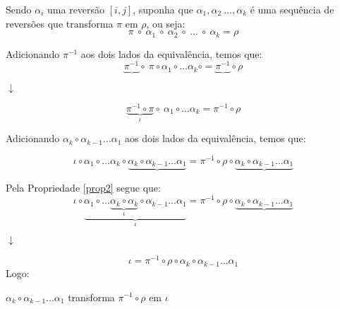 \begin{prova}
Sendo $\alpha_i$ uma reversão $[i, j]$, suponha que $\alpha_1, \alpha_2 \ \ldots,\alpha_k$ é uma sequência de reversões que transforma $\pi$ em $\rho$, ou seja:
\[ \pi \ \circ \ \alpha_1 \ \circ \ \alpha_2 \ \circ \ \ldots \ \circ \ \alpha_k = \rho\]


Adicionando $\pi^{-1}$ aos dois lados da equivalência, temos que: \\


\[ \underbrace{\pi^{-1}} \circ \ \pi \circ \alpha_1 \circ \ldots\alpha_k \circ = \underbrace{\pi^{-1}} \circ \rho \]
\begin{center}
$\downarrow$
\end{center}
\[ \underbrace{\pi^{-1} \circ \pi}_{\iota} \circ \ \alpha_1 \circ \ldots  \alpha_k = \pi^{-1} \circ \rho \]

Adicionando $\alpha_{k} \circ \alpha_{k-1} \ldots \alpha_1$ aos dois lados da equivalência, temos que:

\[ \iota \circ \alpha_1 \circ \ldots\alpha_k \circ \underbrace{\alpha_{k} \circ \alpha_{k-1} \ldots \alpha_1} = \pi^{-1} \circ \rho \circ \underbrace{\alpha_{k} \circ \alpha_{k-1} \ldots \alpha_1}\]



Pela Propriedade \ref{prop2} segue que:\\
\[ \iota \circ \underbrace{\alpha_1 \circ \ldots \underbrace{\alpha_k \circ \alpha_{k}}_{\iota} \circ \alpha_{k-1} \ldots \alpha_1}_{\iota} = \pi^{-1} \circ \rho \circ \underbrace{\alpha_{k} \circ \alpha_{k-1} \ldots \alpha_1}\]

\begin{center}
$\downarrow$
\end{center}

\[ \iota = \pi^{-1} \circ \rho \circ \alpha_{k} \circ \alpha_{k-1} \ldots \alpha_1\]
Logo:
\begin{center}
${\alpha_{k} \circ \alpha_{k-1} \ldots \alpha_1}$ transforma $\pi^{-1} \circ \rho$ em $\iota$
\end{center} 
\end{prova}

